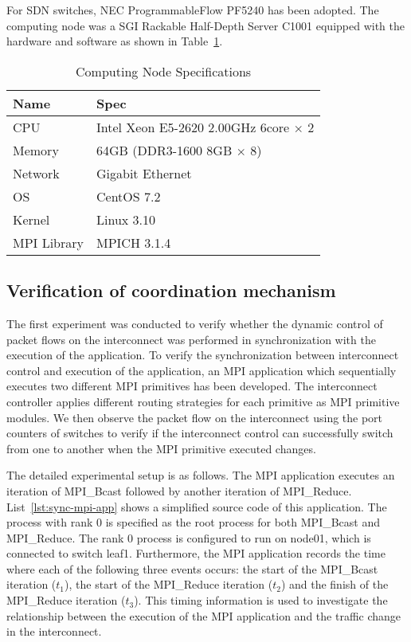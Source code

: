 For SDN switches, NEC ProgrammableFlow PF5240 has been adopted. The computing
node was a SGI Rackable Half-Depth Server C1001 equipped with the hardware and
software as shown in Table~\ref{tbl:node-spec}.

\begin{table}
    \centering
    \caption{Computing Node Specifications}%
    \label{tbl:node-spec}
    \begin{tabular}{ll}
        \toprule
        Name        & Spec                                        \\ \midrule
        CPU         & Intel Xeon E5-2620 2.00GHz 6core $\times$ 2 \\
        Memory      & 64GB (DDR3-1600 8GB $\times$ 8)             \\
        Network     & Gigabit Ethernet                            \\
        OS          & CentOS 7.2                                  \\
        Kernel      & Linux 3.10                                  \\
        MPI Library & MPICH 3.1.4                                 \\ \bottomrule
    \end{tabular}
\end{table}

\subsection{Verification of coordination mechanism}

The first experiment was conducted to verify whether the dynamic control
of packet flows on the interconnect was performed in synchronization
with the execution of the application. To verify the synchronization
between interconnect control and execution of the application, an MPI
application which sequentially executes two different MPI primitives has
been developed. The interconnect controller applies different routing
strategies for each primitive as MPI primitive modules. We then observe
the packet flow on the interconnect using the port counters of switches
to verify if the interconnect control can successfully switch from one
to another when the MPI primitive executed changes.

The detailed experimental setup is as follows. The MPI application
executes an iteration of MPI\_Bcast followed by another iteration of
MPI\_Reduce. List~\ref{lst:sync-mpi-app} shows a simplified source code
of this application. The process with rank 0 is specified as the root
process for both MPI\_Bcast and MPI\_Reduce. The rank 0 process is
configured to run on node01, which is connected to switch leaf1.
Furthermore, the MPI application records the time where each of the
following three events occurs: the start of the MPI\_Bcast iteration
(\(t_1\)), the start of the MPI\_Reduce iteration (\(t_2\)) and the
finish of the MPI\_Reduce iteration (\(t_3\)). This timing information
is used to investigate the relationship between the execution of the MPI
application and the traffic change in the interconnect.

